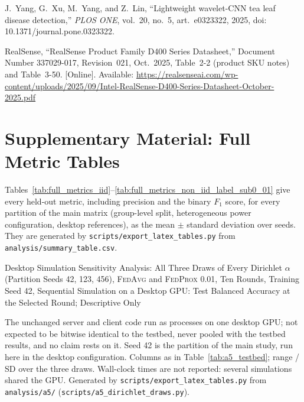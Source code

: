 \documentclass[journal]{IEEEtran}
\newcommand{\fedavg}{\textsc{FedAvg}}
\newcommand{\fedprox}{\textsc{FedProx}}
\begin{document}
\begin{thebibliography}{99}
J.~Yang, G.~Xu, M.~Yang, and Z.~Lin, ``Lightweight wavelet-CNN tea leaf disease detection,'' \emph{PLOS ONE}, vol.~20, no.~5, art.~e0323322, 2025, doi: 10.1371/journal.pone.0323322.

RealSense, ``RealSense Product Family D400 Series Datasheet,'' Document Number 337029-017, Revision~021, Oct.~2025, Table~2-2 (product SKU notes) and Table~3-50. [Online]. Available: \url{https://realsenseai.com/wp-content/uploads/2025/09/Intel-RealSense-D400-Series-Datasheet-October-2025.pdf}

\end{thebibliography}

\clearpage
\onecolumn
\section*{Supplementary Material: Full Metric Tables}
\setcounter{table}{0}
\renewcommand{\thetable}{S\arabic{table}}
Tables~\ref{tab:full_metrics_iid}--\ref{tab:full_metrics_non_iid_label_sub0_01} give every held-out metric, including precision and the binary $F_1$ score, for every partition of the main matrix (group-level split, heterogeneous power configuration, desktop references), as the mean $\pm$ standard deviation over seeds. They are generated by \texttt{scripts/export\_latex\_tables.py} from \texttt{analysis/summary\_table.csv}.
{\renewcommand{\small}{\scriptsize}









}

\begin{table}[t]
\centering
\caption{Desktop Simulation Sensitivity Analysis: All Three Draws of Every Dirichlet $\alpha$ (Partition Seeds 42, 123, 456), \fedavg{} and \fedprox{} 0.01, Ten Rounds, Training Seed 42, Sequential Simulation on a Desktop GPU: Test Balanced Accuracy at the Selected Round; Descriptive Only}
\label{tab:a5_desktop_sim}
\setlength{\tabcolsep}{4pt}
{\footnotesize
}
\vspace{2pt}
\parbox{\textwidth}{\footnotesize The unchanged server and client code run as processes on one desktop GPU; not expected to be bitwise identical to the testbed, never pooled with the testbed results, and no claim rests on it. Seed 42 is the partition of the main study, run here in the desktop configuration. Columns as in Table~\ref{tab:a5_testbed}; range / SD over the three draws. Wall-clock times are not reported: several simulations shared the GPU. Generated by \texttt{scripts/export\_latex\_tables.py} from \texttt{analysis/a5/} (\texttt{scripts/a5\_dirichlet\_draws.py}).}
\end{table}
\end{document}
